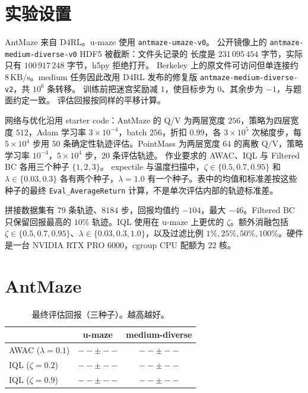 \documentclass[10pt,twocolumn,a4paper]{ctexart}
\providecommand{\IqlZACMediumMean}{--}\providecommand{\IqlZACMediumStd}{--}
\providecommand{\AwacUmazeMean}{--}\providecommand{\AwacUmazeStd}{--}
\providecommand{\AwacMediumMean}{--}\providecommand{\AwacMediumStd}{--}
\providecommand{\IqlZACUmazeMean}{--}\providecommand{\IqlZACUmazeStd}{--}
\providecommand{\IqlZAJUmazeMean}{--}\providecommand{\IqlZAJUmazeStd}{--}
\providecommand{\IqlZAJMediumMean}{--}\providecommand{\IqlZAJMediumStd}{--}
\begin{document}
\section{实验设置}
AntMaze 来自 D4RL\citep{fu2020d4rl}。u-maze 使用 \texttt{antmaze-umaze-v0}。
公开镜像上的 \texttt{antmaze-medium-diverse-v0} HDF5 被截断：文件头记录的
长度是 $231\,095\,454$ 字节，实际只有 $100\,917\,248$ 字节，h5py 拒绝打开。
Berkeley 上的原文件可访问但单连接约 $8\,\mathrm{KB/s}$。medium 任务因此改用
D4RL 发布的修复版 \texttt{antmaze-medium-diverse-v2}，共 $10^{6}$ 条转移。
训练前把迷宫奖励减 $1$，使目标步为 $0$、其余步为 $-1$，与题面约定一致。
评估回报按同样的平移计算。

网络与优化沿用 starter code：AntMaze 的 Q/V 为两层宽度 $256$，策略为四层宽度
$512$，Adam 学习率 $3\times10^{-4}$，batch $256$，折扣 $0.99$，各 $3\times10^{5}$
次梯度步，每 $5\times10^{4}$ 步用 $50$ 条确定性轨迹评估。PointMass 为两层宽度
$64$ 的离散 Q/V，策略学习率 $10^{-4}$，$5\times10^{4}$ 步，$20$ 条评估轨迹。
作业要求的 AWAC、IQL 与 Filtered BC 各用三个种子 $\{1,2,3\}$。
expectile 与温度扫描中，$\zeta\in\{0.5,0.7,0.95\}$ 和 $\lambda\in\{0.03,0.3\}$
各有两个种子，$\lambda=1.0$ 有一个种子。表中的均值和标准差按这些种子的最终
\texttt{Eval\_AverageReturn} 计算，不是单次评估内部的轨迹标准差。

拼接数据集有 $79$ 条轨迹、$8184$ 步，回报均值约 $-104$，最大 $-46$。Filtered BC
只保留回报最高的 $10\%$ 轨迹。IQL 使用在 u-maze 上更优的 $\zeta$。额外消融包括
$\zeta\in\{0.5,0.7,0.95\}$、$\lambda\in\{0.03,0.3,1.0\}$，以及过滤比例
$1\%,25\%,50\%,100\%$。硬件是一台 NVIDIA RTX PRO 6000，cgroup CPU 配额为 $22$ 核。

\section{AntMaze}
\begin{table}[t]
\centering
\caption{最终评估回报（三种子）。越高越好。}
\label{tab:antmaze}
\begin{tabular}{lcc}
\toprule
 & u-maze & medium-diverse \\
\midrule
AWAC ($\lambda=0.1$) & $\AwacUmazeMean\pm\AwacUmazeStd$ & $\AwacMediumMean\pm\AwacMediumStd$ \\
IQL ($\zeta=0.2$) & $\IqlZACUmazeMean\pm\IqlZACUmazeStd$ & $\IqlZACMediumMean\pm\IqlZACMediumStd$ \\
IQL ($\zeta=0.9$) & $\IqlZAJUmazeMean\pm\IqlZAJUmazeStd$ & $\IqlZAJMediumMean\pm\IqlZAJMediumStd$ \\
\bottomrule
\end{tabular}
\end{table}
\end{document}
